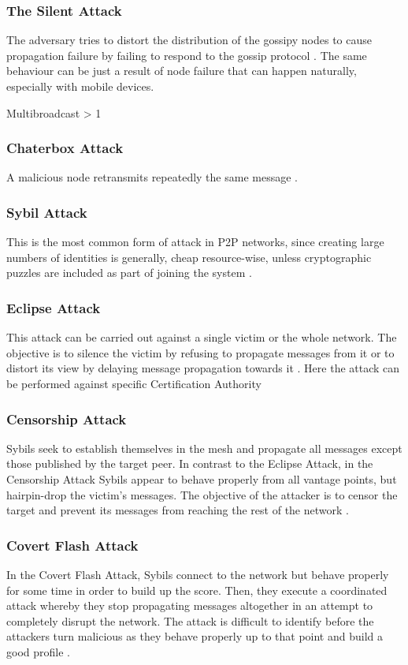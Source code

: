 \documentclass{article}
\begin{document}
\subsubsection{The Silent Attack}
The adversary tries to distort the distribution of the gossipy nodes to cause propagation failure by failing to respond to the gossip protocol \cite{AdHocNet}. The same behaviour can be just a result of node failure that can happen naturally, especially with mobile devices.

Multibroadcast > 1


\subsubsection{Chaterbox Attack}
A malicious node retransmits repeatedly the same message \cite{AdHocNet}.

\subsubsection{Sybil Attack}
This is the most common form of attack in P2P networks, since creating large numbers of identities is
generally, cheap resource-wise, unless cryptographic puzzles are included as part of joining the system \cite{GossipSub}.

\subsubsection{Eclipse Attack}
This attack can be carried out against a single victim or the whole network. The objective is to
silence the victim by refusing to propagate messages from it or to distort its view by delaying message propagation towards it \cite{GossipSub}.
Here the attack can be performed against specific Certification Authority

\subsubsection{Censorship Attack}
Sybils seek to establish themselves in the mesh and propagate all messages except those published by the target peer. In contrast to the Eclipse Attack, in the Censorship Attack Sybils appear to behave properly
from all vantage points, but hairpin-drop the victim's messages. The objective of the attacker is to censor the target and prevent its messages from reaching the rest of the network \cite{GossipSub}.

\subsubsection{Covert Flash Attack}
In the Covert Flash Attack, Sybils connect to the network but behave properly for some time in order to build up the score. Then, they execute a coordinated attack whereby they stop propagating messages altogether in an attempt to completely disrupt the network. The attack is difficult to identify before the attackers turn malicious as they behave properly up to that point and build a good profile \cite{GossipSub}.
\end{document}
